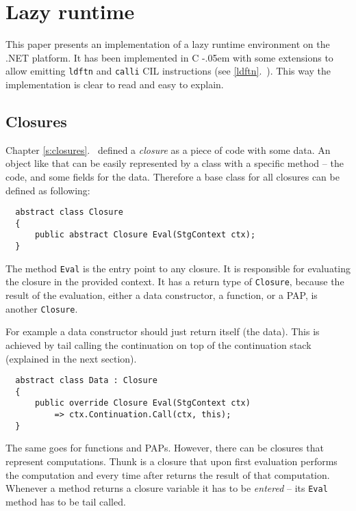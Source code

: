 \documentclass[en]{pracamgr}
\newcommand{\shrp}{%
  {\settoheight{\dimen0}{C}\kern-.05em \resizebox{!}{\dimen0}{\raisebox{\depth}{\textbf{\#}}}\hspace{1ex}}}
\newcommand{\myref}[1]{\ref{#1}.~\nameref{#1}}
\begin{document}
\chapter{Lazy runtime}\label{r:runtime}

This paper presents an implementation of a lazy runtime environment
on the .NET platform. It has been implemented in C\shrp with some
extensions to allow emitting \texttt{ldftn} and \texttt{calli}
CIL instructions (see \myref{ldftn}). This way the implementation
is clear to read and easy to explain.

\section{Closures}
Chapter \myref{s:closures} defined a \textit{closure} as a piece of
code with some data. An object like that can be easily represented
by a class with a specific method -- the code, and some fields for the data.
Therefore a base class for all closures can be defined as following:

\begin{verbatim}
  abstract class Closure
  {
      public abstract Closure Eval(StgContext ctx);
  }
\end{verbatim}

The method \texttt{Eval} is the entry point to any closure. It is responsible for
evaluating the closure in the provided context.
It has a return type of \texttt{Closure}, because the result of the evaluation,
either a data constructor, a function, or a PAP, is another \texttt{Closure}.

For example a data constructor should just return itself (the data).
This is achieved by tail calling the continuation on top of the
continuation stack (explained in the next section).

\begin{verbatim}
  abstract class Data : Closure
  {
      public override Closure Eval(StgContext ctx)
          => ctx.Continuation.Call(ctx, this);
  }
\end{verbatim}

The same goes for functions and PAPs. However, there can be
closures that represent computations. Thunk is a closure
that upon first evaluation performs the computation
and every time after returns the result of that computation.
Whenever a method returns a closure variable it has to be \textit{entered}
-- its \texttt{Eval} method has to be tail called.
\end{document}
